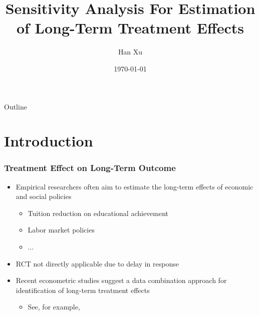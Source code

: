 \documentclass{beamer}					%
\title[Sensitivity Analysis]{Sensitivity Analysis For Estimation of Long-Term Treatment Effects}	%
\author{Han Xu}								%
\institute[Penn State]{Penn State, Department of Economics}					%
\date{\today}									%
\begin{document}
\begin{frame}
  \titlepage
\end{frame}

\begin{frame}{Outline}
  \tableofcontents
\end{frame}

%
\section{Introduction}

\begin{frame}
    \frametitle{Treatment Effect on Long-Term Outcome}
    \begin{itemize}
        \item Empirical researchers often aim to estimate the long-term effects of economic and social policies
        \begin{itemize}
            \item Tuition reduction on educational achievement \parencite{dynarski2018closing}
            \item Labor market policies \parencite{mckenzie2017effective}
            \item ...
        \end{itemize}
        \item RCT not directly applicable due to delay in response
        \item Recent econometric studies suggest a data combination approach for identification of long-term treatment effects
        \begin{itemize}
            \item See, for example, \textcite{athey2020combining, colnet2020causal, huang2021leveraging,ghassami2022combining}
        \end{itemize}
    \end{itemize}
\end{frame}
\end{document}
